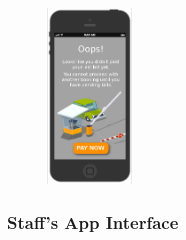 \documentclass[11pt]{article} %
\begin{document}
\begin{figure}[H]
	\includegraphics[width=0.2\textwidth]{mockup/10PendingBills.png}
	
\end{figure}
\subsubsection{Staff's App Interface}
\end{document}
